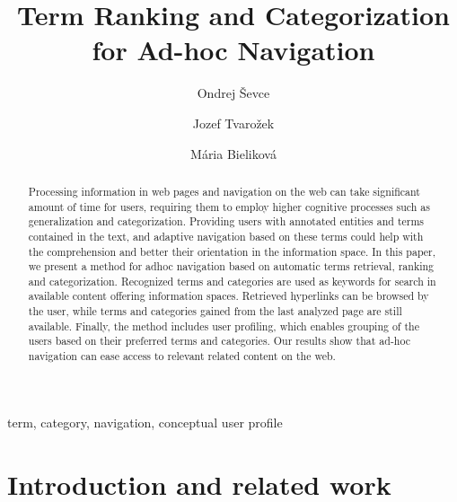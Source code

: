 \documentclass{llncs}%
\begin{document}
\title{Term Ranking and Categorization  for Ad-hoc Navigation}
%
\titlerunning{}  %
%
\author{Ondrej Ševce \and Jozef Tvarožek \and
Mária Bieliková}
%
\authorrunning{} %
%

\maketitle            

\begin{abstract}
Processing information in web pages and navigation on the web can take significant amount of time for users, requiring them to employ higher cognitive processes such as generalization and categorization. Providing users with annotated entities and terms contained in the text, and adaptive navigation based on these terms could help with the comprehension and better their orientation in the information space. In this paper, we present a method for adhoc navigation based on automatic terms retrieval, ranking and categorization. Recognized terms and categories are used as keywords for search in available content offering information spaces. Retrieved hyperlinks can be browsed by the user, while terms and categories gained from the last analyzed page are still available. Finally, the method includes user profiling, which enables grouping of the users based on their preferred terms and categories. Our results show that ad-hoc navigation can ease access to relevant related content on the web. 
\end{abstract}

\begin{center}%
\begin{keywords}
term, category, navigation, conceptual user profile
\end{keywords}
\end{center}

\section{Introduction and related work}
\end{document}
